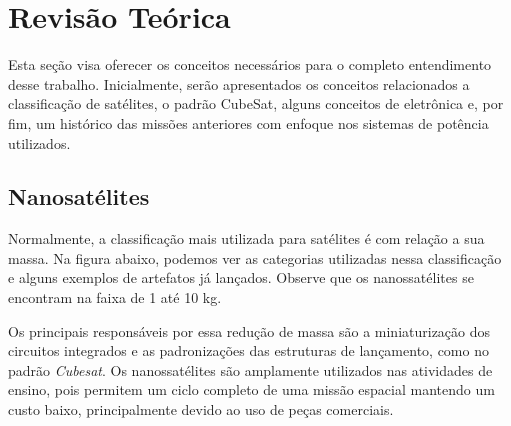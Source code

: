 \chapter{Revisão Teórica} \label{revisão}

Esta seção visa oferecer os conceitos necessários para o completo entendimento desse trabalho. Inicialmente, serão apresentados os conceitos relacionados a classificação de satélites, o padrão CubeSat, alguns conceitos de eletrônica e, por fim, um histórico das missões anteriores com enfoque nos sistemas de potência utilizados.

\section{Nanosatélites}\label{nanosats_revision}
Normalmente, a classificação mais utilizada para satélites é com relação a sua massa. Na figura abaixo, podemos ver as categorias utilizadas nessa classificação e alguns exemplos de artefatos já lançados. Observe que os nanossatélites se encontram na faixa de 1 até 10 kg.

\noindent
\begin{minipage}{\linewidth}
\label{mass_classification_fig}
\end{minipage}

 Os principais responsáveis por essa redução de massa são a miniaturização dos circuitos integrados e as padronizações das estruturas de lançamento, como no padrão \textit{Cubesat}. Os nanossatélites são amplamente utilizados nas atividades de ensino, pois permitem um ciclo completo de uma missão espacial mantendo um custo baixo, principalmente devido ao uso de peças comerciais.\cite{barnhart_ref}

